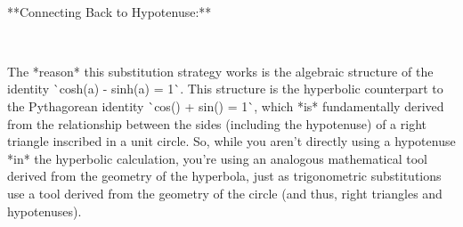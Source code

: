 \documentclass{article}
\begin{document}
\

**Connecting Back to Hypotenuse:**

\

The *reason* this substitution strategy works is the algebraic structure of
the identity \`{}cosh{\texttwosuperior}(a) - sinh{\texttwosuperior}(a) =
1\`{}. This structure is the hyperbolic counterpart to the Pythagorean
identity \`{}cos{\texttwosuperior}({\theta}) + sin{\texttwosuperior}({\theta})
= 1\`{}, which *is* fundamentally derived from the relationship between the
sides (including the hypotenuse) of a right triangle inscribed in a unit
circle. So, while you aren't directly using a hypotenuse *in* the hyperbolic
calculation, you're using an analogous mathematical tool derived from the
geometry of the hyperbola, just as trigonometric substitutions use a tool
derived from the geometry of the circle (and thus, right triangles and
hypotenuses).
\end{document}

